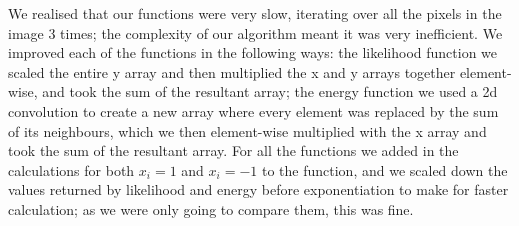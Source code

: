 \documentclass{article}
\begin{document}
We realised that our functions were very slow, iterating over all the pixels in the image 3 times; the complexity of our algorithm meant it was very inefficient. We improved each of the functions in the following ways: the likelihood function we scaled the entire y array and then multiplied the x and y arrays together element-wise, and took the sum of the resultant array; the energy function we used a 2d convolution to create a new array where every element was replaced by the sum of its neighbours, which we then element-wise multiplied with the x array and took the sum of the resultant array. For all the functions we added in the calculations for both $x_{i} = 1$ and $x_{i} = -1$ to the function, and we scaled down the values returned by likelihood and energy before exponentiation to make for faster calculation; as we were only going to compare them, this was fine.
\end{document}
